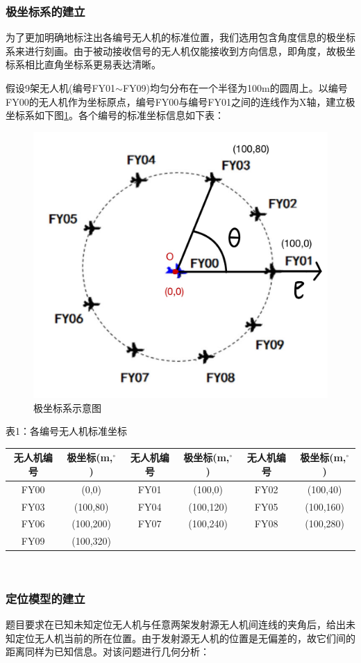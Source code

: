 \documentclass{ctexart}
\begin{document}
\subsubsection{极坐标系的建立}

为了更加明确地标注出各编号无人机的标准位置，我们选用包含角度信息的极坐标系来进行刻画。由于被动接收信号的无人机仅能接收到方向信息，即角度，故极坐标系相比直角坐标系更易表达清晰。

假设9架无人机(编号FY01$\sim$FY09)均匀分布在一个半径为100m的圆周上。以编号FY00的无人机作为坐标原点，编号FY00与编号FY01之间的连线作为X轴，建立极坐标系如下图\ref{极坐标系示意图}。各个编号的标准坐标信息如下表：

\begin{figure}[H]
  \centering
  \includegraphics[width=0.40\linewidth]{pic/极坐标.jpg}
  \caption{极坐标系示意图}
  \label{极坐标系示意图}
  \end{figure} 

\begin{center}
  表1：各编号无人机标准坐标
  ~\\
    \begin{tabular}{|c|c|c|c|c|c|}
        \hline
        无人机编号&极坐标(m,$^{\circ}$)&无人机编号&极坐标(m,$^{\circ}$)&无人机编号&极坐标(m,$^{\circ}$)\\
        \hline
        FY00&(0,0)&FY01&(100,0)&FY02&(100,40)\\
        \hline
        FY03&(100,80)&FY04&(100,120)&FY05&(100,160)\\
        \hline
        FY06&(100,200)&FY07&(100,240)&FY08&(100,280)\\
        \hline
        FY09&(100,320)& & & &\\    

        \hline
    \end{tabular}\\
\end{center}
\subsubsection{定位模型的建立}
题目要求在已知未知定位无人机与任意两架发射源无人机间连线的夹角后，给出未知定位无人机当前的所在位置。由于发射源无人机的位置是无偏差的，故它们间的距离同样为已知信息。对该问题进行几何分析：
\end{document}
